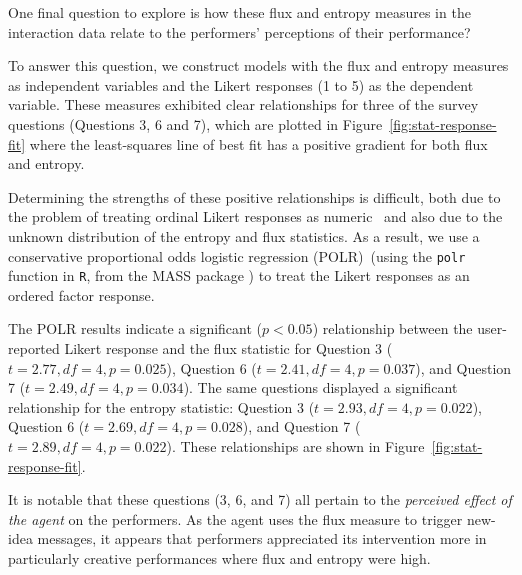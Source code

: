 \documentclass{sigchi}
\begin{document}
One final question to explore is how these flux and entropy measures
in the interaction data relate to the performers' perceptions of their
performance?

To answer this question, we construct models with the flux and entropy
measures as independent variables and the Likert responses (1 to 5) as
the dependent variable. These measures exhibited clear relationships
for three of the survey questions (Questions 3, 6 and 7), which are
plotted in Figure~\ref{fig:stat-response-fit} where the least-squares
line of best fit has a positive gradient for both flux and entropy.

Determining the strengths of these positive relationships is
difficult, both due to the problem of treating ordinal Likert
responses as numeric~\cite{Gardner:2007fj} and also
due to the unknown distribution of the entropy and flux statistics. As
a result, we use a conservative proportional odds logistic regression
(POLR)~(using the \texttt{polr} function in \texttt{R}, from the MASS
package \cite{Venables:2002qv}) to treat the Likert responses as an
ordered factor response.

The POLR results indicate a significant ($p<0.05$) relationship
between the user-reported Likert response and the flux statistic for
Question 3 ($t = 2.77, df = 4, p = 0.025$), Question 6
($t = 2.41, df = 4, p = 0.037$), and Question 7
($t = 2.49, df = 4, p = 0.034$). The same questions displayed a
significant relationship for the entropy statistic: Question 3
($t = 2.93, df = 4, p = 0.022$), Question 6
($t = 2.69, df = 4, p = 0.028$), and Question 7
($t = 2.89, df = 4, p = 0.022$). These relationships are shown in
Figure~\ref{fig:stat-response-fit}.

It is notable that these questions (3, 6, and 7) all pertain to the
\emph{perceived effect of the agent} on the performers. As the agent
uses the flux measure to trigger new-idea messages, it appears that
performers appreciated its intervention more in particularly creative
performances where flux and entropy were high.






\end{document}

